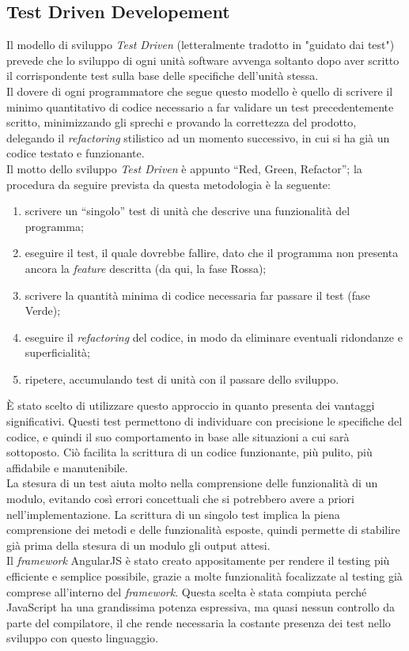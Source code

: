 \subsection{Test Driven Developement}
Il modello di sviluppo \emph{Test Driven} (letteralmente tradotto in "guidato dai test") prevede che lo sviluppo di ogni unità software avvenga soltanto dopo aver scritto il corrispondente test sulla base delle specifiche dell’unità stessa.\\
Il dovere di ogni programmatore che segue questo modello è quello di scrivere il minimo quantitativo di codice necessario a far validare un test precedentemente scritto, minimizzando gli sprechi e provando la correttezza del prodotto, delegando il \emph{refactoring} stilistico ad un momento successivo, in cui si ha già un codice testato e funzionante.\\
Il motto dello sviluppo \emph{Test Driven} è appunto “Red, Green, Refactor”; la procedura da seguire prevista da questa metodologia è la seguente:
\begin{enumerate}
	\item scrivere un “singolo” test di unità che descrive una funzionalità del programma;
	\item eseguire il test, il quale dovrebbe fallire, dato che il programma non presenta ancora la \emph{feature} descritta (da qui, la fase Rossa);
	\item scrivere la quantità minima di codice necessaria far passare il test (fase Verde);
	\item eseguire il \emph{refactoring} del codice, in modo da eliminare eventuali ridondanze e superficialità;
	\item ripetere, accumulando test di unità con il passare dello sviluppo.
\end{enumerate}
 \`{E} stato scelto di utilizzare questo approccio in quanto presenta dei vantaggi significativi. Questi test permettono di individuare con precisione le specifiche del codice, e quindi il suo comportamento in base alle situazioni a cui sarà sottoposto. Ciò facilita la scrittura di un codice funzionante, più pulito, più affidabile e manutenibile.\\
La stesura di un test aiuta molto nella comprensione delle funzionalità di un modulo, evitando così errori concettuali che si potrebbero avere a priori nell'implementazione. La scrittura di un singolo test implica la piena comprensione dei metodi e delle funzionalità esposte, quindi permette di stabilire già prima della stesura di un modulo gli output attesi.\\
Il \emph{framework} AngularJS è stato creato appositamente per rendere il testing più efficiente e semplice possibile, grazie a molte funzionalità focalizzate al testing già comprese all’interno del \emph{framework}. Questa scelta è stata compiuta perché JavaScript ha una grandissima potenza espressiva, ma quasi nessun controllo da parte del compilatore, il che rende necessaria la costante presenza dei test nello sviluppo con questo linguaggio.

